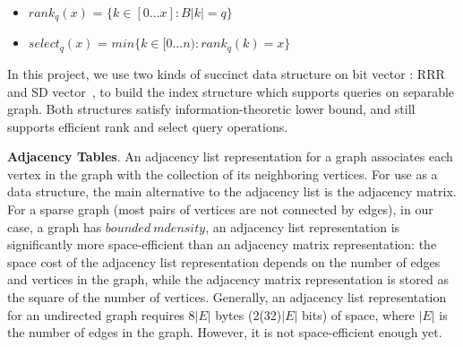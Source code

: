 \documentclass[12pt,glossary]{dalthesis}
\begin{document}
\begin{itemize}[noitemsep]
\item $rank_{q}(x)$ = $\{k \in [0...x] : B|k| = q \}$
\item $select_{q}(x)$ = $ min \{ k \in [0...n) : rank_{q}(k) = x \} $ 
\end{itemize}

\bigskip

In this project, we use two kinds of succinct data structure on bit vector : RRR~\cite{RRR} and SD vector~\cite{SD-vector}, to build the index structure which supports queries on separable graph. Both structures satisfy information-theoretic lower bound, and still supports efficient rank and select query operations.

\bigskip
\bigskip

\textbf{Adjacency Tables}. An adjacency list representation for a graph associates each vertex in the graph with the collection of its neighboring vertices. For use as a data structure, the main alternative to the adjacency list is the adjacency matrix. For a sparse graph (most pairs of vertices are not connected by edges), in our case, a graph has $bounded \ mdensity$, an adjacency list representation is significantly more space-efficient than an adjacency matrix representation: the space cost of the adjacency list representation depends on the number of edges and vertices in the graph, while the adjacency matrix representation is stored as the square of the number of vertices. Generally, an adjacency list representation for an undirected graph requires 8$|E|$ bytes (2(32)$|E|$ bits) of space, where $|E|$ is the number of edges in the graph. However, it is not space-efficient enough yet.

\bigskip
\bigskip
\end{document}

